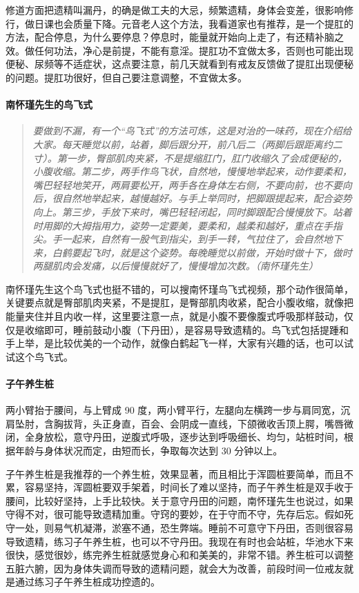 修道方面把遗精叫漏丹，的确是做工夫的大忌，频繁遗精，身体会变差，很影响修行，做日课也会质量下降。元音老人这个方法，我看道家也有推荐，是一个提肛的方法，配合停息，为什么要停息？停息时，能量就开始向上走了，有还精补脑之效。做任何功法，净心是前提，不能有意淫。提肛功不宜做太多，否则也可能出现便秘、尿频等不适症状，这点要注意，前几天就看到有戒友反馈做了提肛出现便秘的问题。提肛功很好，但自己要注意调整，不宜做太多。

\paragraph{南怀瑾先生的鸟飞式}

\begin{quote}\it
    要做到不漏，有一个“鸟飞式”的方法可炼，这是对治的一味药，现在介绍给大家。每天睡觉以前，站着，脚后跟分开，前八后二（两脚后跟距离约二寸）。第一步，臀部肌肉夹紧，不是提缩肛门，肛门收缩久了会成便秘的，小腹收缩。第二步，两手作鸟飞状，自然地，慢慢地举起来，动作要柔和，嘴巴轻轻地笑开，两肩要松开，两手各在身体左右侧，不要向前，也不要向后，很自然地举起来，越慢越好。与手上举同时，把脚跟提起来，配合姿势向上。第三步，手放下来时，嘴巴轻轻闭起，同时脚跟配合慢慢放下。站着时用脚的大拇指用力，姿势一定要美，要柔和，越柔和越好，重点在手指尖。手一起来，自然有一股气到指尖，到手一转，气拉住了，会自然地下来，白鹤要起飞时，就是这个姿势。每晚睡觉以前做，开始时做十下，做时两腿肌肉会发痛，以后慢慢就好了，慢慢增加次数。（南怀瑾先生）
\end{quote}

南怀瑾先生这个鸟飞式也挺不错的，可以搜南怀瑾鸟飞式视频，那个动作很简单，关键要点就是臀部肌肉夹紧，不是提肛，是臀部肌肉收紧，配合小腹收缩，就像把能量夹住并且内收一样，这里要注意一点，就是小腹不要像腹式呼吸那样鼓动，仅仅是收缩即可，睡前鼓动小腹（下丹田），是容易导致遗精的。鸟飞式包括提踵和手上举，是比较优美的一个动作，就像白鹤起飞一样，大家有兴趣的话，也可以试试这个鸟飞式。

\paragraph{子午养生桩}

两小臂抬于腰间，与上臂成 90 度，两小臂平行，左腿向左横跨一步与肩同宽，沉肩坠肘，含胸拔背，头正身直，百会、会阴成一直线，下颌微收舌顶上腭，嘴唇微闭，全身放松，意守丹田，逆腹式呼吸，逐步达到呼吸细长、均匀，站桩时间，根据年龄与身体状况而定，由短而长，争取每次达到 30 分钟以上。

子午养生桩是我推荐的一个养生桩，效果显著，而且相比于浑圆桩要简单，而且不累，容易坚持，浑圆桩要双手架着，时间长了难以坚持，而子午养生桩是双手收于腰间，比较好坚持，上手比较快。关于意守丹田的问题，南怀瑾先生也说过，如果守得不对，很可能导致遗精加重。守窍的要妙，在于守而不守，先存后忘。假如死守一处，则易气机凝滞，淤塞不通，恐生弊端。睡前不可意守下丹田，否则很容易导致遗精，练习子午养生桩，也可以不守丹田。我现在有时也会站桩，华池水下来很快，感觉很妙，练完养生桩就感觉身心和和美美的，非常不错。养生桩可以调整五脏六腑，因为身体失调而导致的遗精问题，就会大为改善，前段时间一位戒友就是通过练习子午养生桩成功控遗的。

